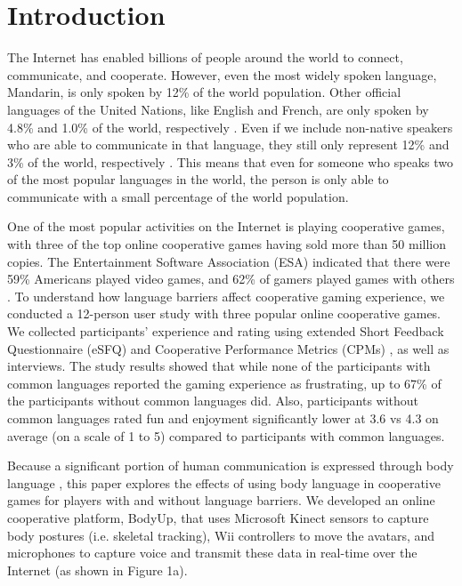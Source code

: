 \chapter{Introduction}
\label{c:intro}
The Internet has enabled billions of people around the world to connect, communicate, and cooperate. However, even the most widely spoken language, Mandarin, is only spoken by 12\% of the world population. 
Other official languages of the United Nations, like English and French, are only spoken by 4.8\% and 1.0\% of the world, respectively \cite{I1}. 
Even if we include non-native speakers who are able to communicate in that language, they still only represent 12\% and 3\% of the world, respectively \cite{I2,I3}. This means that even for someone who speaks two of the most popular languages in the world, the person is only able to communicate with a small percentage of the world population.

One of the most popular activities on the Internet is playing cooperative games, with three of the top online cooperative games having sold more than 50 million copies. The Entertainment Software Association (ESA) indicated that there were 59\% Americans played video games, and 62\% of gamers played games with others \cite{I4}. To understand how language barriers affect cooperative gaming experience, we conducted a 12-person user study with three popular online cooperative games. We collected participants' experience and rating using extended Short Feedback Questionnaire (eSFQ) \cite{eSFQ} and Cooperative Performance Metrics (CPMs) \cite{CPMs}, as well as interviews. The study results showed that while none of the participants with common languages reported the gaming experience as frustrating, up to 67\% of the participants without common languages did. Also, participants without common languages rated fun and enjoyment significantly lower at 3.6 vs 4.3 on average (on a scale of 1 to 5) compared to participants with common languages. 

Because a significant portion of human communication is expressed through body language \cite{GD2}, this paper explores the effects of using body language in cooperative games for players with and without language barriers. We developed an online cooperative platform, BodyUp, that uses Microsoft Kinect sensors to capture body postures (i.e. skeletal tracking), Wii controllers to move the avatars, and microphones to capture voice and transmit these data in real-time over the Internet (as shown in Figure 1a). 

